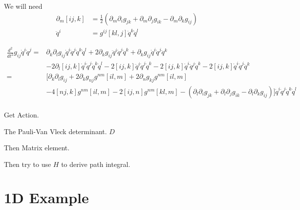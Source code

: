 We will need 
\begin{align}
\partial_m[ij,k] &= \frac{1}{2}(\partial_m\partial_ig_{jk} + \partial_m\partial_jg_{ik} - \partial_m\partial_kg_{ij})\\
\ddot{q}^i &= g^{ij}[kl,j]\dot{q}^k\dot{q}^l
\end{align}

\begin{align}
\frac{d^2}{dt^2}g_{ij}\dot{q}^i\dot{q}^j  =& \partial_k\partial_lg_{ij}\dot{q}^i\dot{q}^j\dot{q}^k\dot{q}^l + 2\partial_kg_{ij}\ddot{q}^i\dot{q}^j\dot{q}^k + \partial_kg_{ij}\dot{q}^i\dot{q}^j\ddot{q}^k\nonumber\\
&-2\partial_l[ij,k]\dot{q}^i\dot{q}^j\dot{q}^k\dot{q}^l - 2[ij,k]\ddot{q}^i\dot{q}^j\dot{q}^k- 2[ij,k]\dot{q}^i\ddot{q}^j\dot{q}^k- 2[ij,k]\dot{q}^i\dot{q}^j\ddot{q}^k\\
=&\bigg[ \partial_k\partial_lg_{ij} + 2\partial_kg_{nj}g^{nm}[il,m] + 2\partial_ng_{kj}g^{nm}[il,m]\nonumber\\
 &  - 4[nj,k]g^{nm}[il,m] - 2[ij,n]g^{nm}[kl,m]- 
(\partial_l\partial_ig_{jk} + \partial_l\partial_jg_{ik} - \partial_l\partial_kg_{ij})\bigg]
\dot{q}^i\dot{q}^j\dot{q}^k\dot{q}^l\\
\end{align}

Get Action.

The Pauli-Van Vleck determinant.  $D$

Then Matrix element. 

Then try to use $H$ to derive path integral.  

\section{1D Example}

